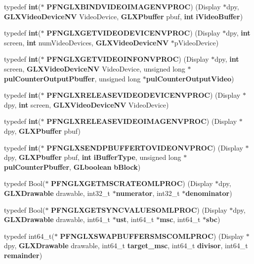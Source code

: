\begin{DoxyCompactItemize}
\item 
typedef {\bf int}($\ast$ {\bf P\+F\+N\+G\+L\+X\+B\+I\+N\+D\+V\+I\+D\+E\+O\+I\+M\+A\+G\+E\+N\+V\+P\+R\+OC}) (Display $\ast$dpy, {\bf G\+L\+X\+Video\+Device\+NV} Video\+Device, {\bf G\+L\+X\+Pbuffer} pbuf, {\bf int} {\bf i\+Video\+Buffer})
\item 
typedef {\bf int}($\ast$ {\bf P\+F\+N\+G\+L\+X\+G\+E\+T\+V\+I\+D\+E\+O\+D\+E\+V\+I\+C\+E\+N\+V\+P\+R\+OC}) (Display $\ast$dpy, {\bf int} screen, {\bf int} num\+Video\+Devices, {\bf G\+L\+X\+Video\+Device\+NV} $\ast$p\+Video\+Device)
\item 
typedef {\bf int}($\ast$ {\bf P\+F\+N\+G\+L\+X\+G\+E\+T\+V\+I\+D\+E\+O\+I\+N\+F\+O\+N\+V\+P\+R\+OC}) (Display $\ast$dpy, {\bf int} screen, {\bf G\+L\+X\+Video\+Device\+NV} Video\+Device, unsigned long $\ast${\bf pul\+Counter\+Output\+Pbuffer}, unsigned long $\ast${\bf pul\+Counter\+Output\+Video})
\item 
typedef {\bf int}($\ast$ {\bf P\+F\+N\+G\+L\+X\+R\+E\+L\+E\+A\+S\+E\+V\+I\+D\+E\+O\+D\+E\+V\+I\+C\+E\+N\+V\+P\+R\+OC}) (Display $\ast$dpy, {\bf int} screen, {\bf G\+L\+X\+Video\+Device\+NV} Video\+Device)
\item 
typedef {\bf int}($\ast$ {\bf P\+F\+N\+G\+L\+X\+R\+E\+L\+E\+A\+S\+E\+V\+I\+D\+E\+O\+I\+M\+A\+G\+E\+N\+V\+P\+R\+OC}) (Display $\ast$dpy, {\bf G\+L\+X\+Pbuffer} pbuf)
\item 
typedef {\bf int}($\ast$ {\bf P\+F\+N\+G\+L\+X\+S\+E\+N\+D\+P\+B\+U\+F\+F\+E\+R\+T\+O\+V\+I\+D\+E\+O\+N\+V\+P\+R\+OC}) (Display $\ast$dpy, {\bf G\+L\+X\+Pbuffer} pbuf, {\bf int} {\bf i\+Buffer\+Type}, unsigned long $\ast${\bf pul\+Counter\+Pbuffer}, {\bf G\+Lboolean} {\bf b\+Block})
\item 
typedef Bool($\ast$ {\bf P\+F\+N\+G\+L\+X\+G\+E\+T\+M\+S\+C\+R\+A\+T\+E\+O\+M\+L\+P\+R\+OC}) (Display $\ast$dpy, {\bf G\+L\+X\+Drawable} drawable, int32\+\_\+t $\ast${\bf numerator}, int32\+\_\+t $\ast${\bf denominator})
\item 
typedef Bool($\ast$ {\bf P\+F\+N\+G\+L\+X\+G\+E\+T\+S\+Y\+N\+C\+V\+A\+L\+U\+E\+S\+O\+M\+L\+P\+R\+OC}) (Display $\ast$dpy, {\bf G\+L\+X\+Drawable} drawable, int64\+\_\+t $\ast${\bf ust}, int64\+\_\+t $\ast${\bf msc}, int64\+\_\+t $\ast${\bf sbc})
\item 
typedef int64\+\_\+t($\ast$ {\bf P\+F\+N\+G\+L\+X\+S\+W\+A\+P\+B\+U\+F\+F\+E\+R\+S\+M\+S\+C\+O\+M\+L\+P\+R\+OC}) (Display $\ast$dpy, {\bf G\+L\+X\+Drawable} drawable, int64\+\_\+t {\bf target\+\_\+msc}, int64\+\_\+t {\bf divisor}, int64\+\_\+t {\bf remainder})
\item 

\end{DoxyCompactItemize}
